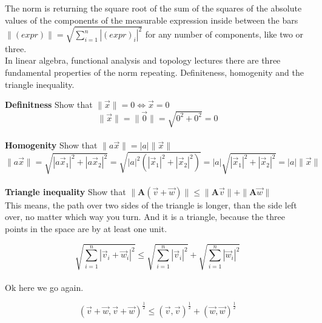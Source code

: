 \documentclass[a4paper]{article}
\begin{document}
\begin{Example}
 The norm is returning  the square root of the sum of the squares of the absolute values of the components of the measurable expression inside between the bars $\|(expr)\| = \sqrt{\sum_{i=1}^{n}|(expr)_{i}|^2}$ for any number of components, like two or three.\\

In linear algebra, functional analysis and topology lectures there are three fundamental properties of the norm repeating. Definiteness, homogenity and the triangle inequality. 

\textbf{Definitness} Show that $\|\vec{x}\| = 0 \iff \vec{x} = 0$\\

\begin{displaymath}
    \|\vec{x}\| = \|\vec{0}\| = \sqrt{0^{2} + 0^{2}} = 0
\end{displaymath}\\

\textbf{Homogenity} Show that $\|a\vec{x}\| = |a|\|\vec{x}\|$\\

\begin{displaymath}
    \|a\vec{x}\| = \sqrt{|a\vec{x}_1|^{2} + |a\vec{x}_2|^{2}} = \sqrt{|a|^{2}(|\vec{x}_1|^{2} + |\vec{x}_2|^{2})} = |a|\sqrt{|\vec{x}_1|^{2} + |\vec{x}_2|^{2}} = |a|\|\vec{x}\|
\end{displaymath}\\

\textbf{Triangle inequality} Show that $ \|\boldsymbol{A}(\vec{v} + \vec{w})\| \leq \|\boldsymbol{A}\vec{v}\| + \|\boldsymbol{A}\vec{w}\|$\\

This means, the path over two sides of the triangle is longer, than the side left over, no matter which way you turn. And it is a triangle, because the three points in the space are by at least one unit.

\begin{displaymath}
    \sqrt{\sum_{i=1}^{n}|\vec{v}_{i} + \vec{w}_{i}|^{2}} \leq \sqrt{\sum_{i=1}^{n}|\vec{v}_{i}|^{2}} + \sqrt{\sum_{i=1}^{n}|\vec{w}_{i}|^{2}} 
\end{displaymath}\\

Ok here we go again.

\begin{displaymath}
(\vec{v}+\vec{w}, \vec{v}+\vec{w})^{\frac{1}{2}} \leq (\vec{v},\vec{v})^{\frac{1}{2}}+(\vec{w},\vec{w})^{\frac{1}{2}}
\end{displaymath}


\end{Example}
\end{document}
